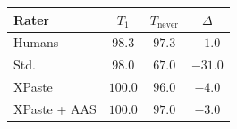 \begin{tabular}{lccc}
\toprule
Rater & $T_1$ & $T_{\text{never}}$ & $\Delta$ \\
\midrule
Humans & $98.3$ & $97.3$ & $-1.0$ \\
\midrule
Std. & $98.0$ & $67.0$ & $-31.0$ \\
XPaste & $100.0$ & $96.0$ & $-4.0$ \\
\rowcolor{oursrow} XPaste + AAS & $100.0$ & $97.0$ & $-3.0$ \\
\bottomrule
\end{tabular}
